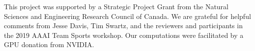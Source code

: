 \documentclass{article}
\begin{document}
\begin{ack} This project was supported by a Strategic Project Grant from the Natural Sciences and Engineering Research Council of Canada. We are grateful for helpful comments from Jesse Davis, Tim Swartz, and the reviewers and participants in the 2019 AAAI Team Sports workshop. Our computations were facilitated by a GPU donation from NVIDIA.




\end{ack}



\end{document}
